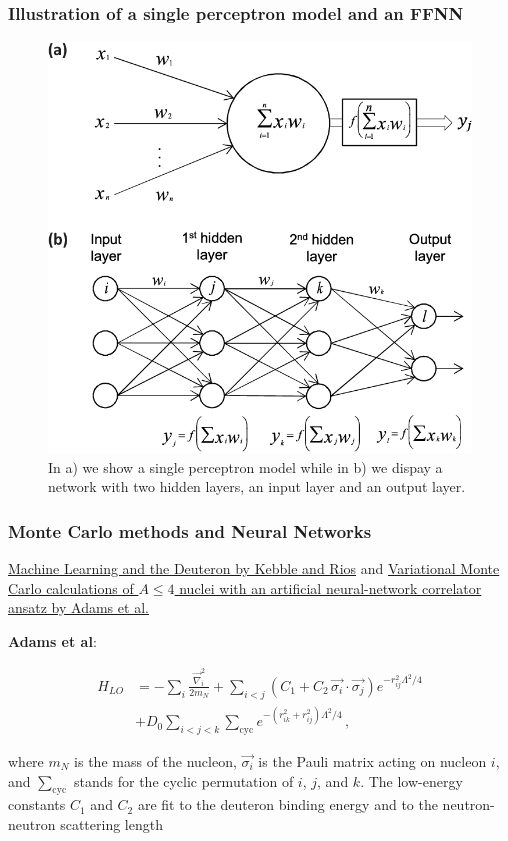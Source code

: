 \documentclass{beamer}
\begin{document}
\begin{frame}
\frametitle{Illustration of a single perceptron model and an FFNN}

\begin{figure}[!ht]  %
  \centerline{\includegraphics[width=0.7\linewidth]{figures/nns.png}}
  \caption{
  In a) we show a single perceptron model while in b) we dispay a network with two  hidden layers, an input layer and an output layer.
  }
\end{figure}
\end{frame}

\begin{frame}
\frametitle{Monte Carlo methods and Neural Networks}

\href{{https://www.sciencedirect.com/science/article/pii/S0370269320305463?via%3Dihub}}{Machine Learning and the Deuteron by Kebble and Rios} and
\href{{https://journals.aps.org/prl/abstract/10.1103/PhysRevLett.127.022502}}{Variational Monte Carlo calculations of $A\le 4$ nuclei with an artificial neural-network correlator ansatz by Adams et al.}

\textbf{Adams et al}:

\begin{align}
H_{LO} &=-\sum_i \frac{{\vec{\nabla}_i^2}}{2m_N}
+\sum_{i<j} {\left(C_1  + C_2\, \vec{\sigma_i}\cdot\vec{\sigma_j}\right)
e^{-r_{ij}^2\Lambda^2 / 4 }}
\nonumber\\
&+D_0 \sum_{i<j<k} \sum_{\text{cyc}}
{e^{-\left(r_{ik}^2+r_{ij}^2\right)\Lambda^2/4}}\,,
\end{align}

where $m_N$ is the mass of the nucleon, $\vec{\sigma_i}$ is the Pauli
matrix acting on nucleon $i$, and $\sum_{\text{cyc}}$ stands for the
cyclic permutation of $i$, $j$, and $k$. The low-energy constants
$C_1$ and $C_2$ are fit to the deuteron binding energy and to the
neutron-neutron scattering length
\end{frame}
\end{document}
